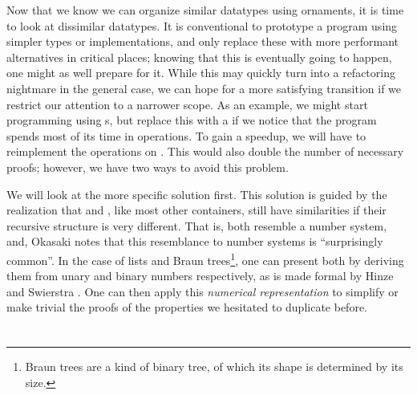 Now that we know we can organize similar datatypes using ornaments, it is time to look at dissimilar datatypes. It is conventional to prototype a program using simpler types or implementations, and only replace these with more performant alternatives in critical places; knowing that this is eventually going to happen, one might as well prepare for it. While this may quickly turn into a refactoring nightmare in the general case, we can hope for a more satisfying transition if we restrict our attention to a narrower scope. As an example, we might start programming using s, but replace this with a  if we notice that the program spends most of its time in  operations. To gain a speedup, we will have to reimplement the operations on . This would also double the number of necessary proofs; however, we have two ways to avoid this problem. 

We will look at the more specific solution first. This solution is guided by the realization that  and , like most other containers, still have similarities if their recursive structure is very different. That is, both resemble a number system, and, Okasaki \cite{purelyfunctional} notes that this resemblance to number systems is ``surprisingly common''. In the case of lists and Braun trees\footnote{Braun trees are a kind of binary tree, of which its shape is determined by its size.}, one can present both by deriving them from unary and binary numbers respectively, as is made formal by Hinze and Swierstra \cite{calcdata}. One can then apply this \textit{numerical representation} to simplify or make trivial the proofs of the properties we hesitated to duplicate before.




\section{}

